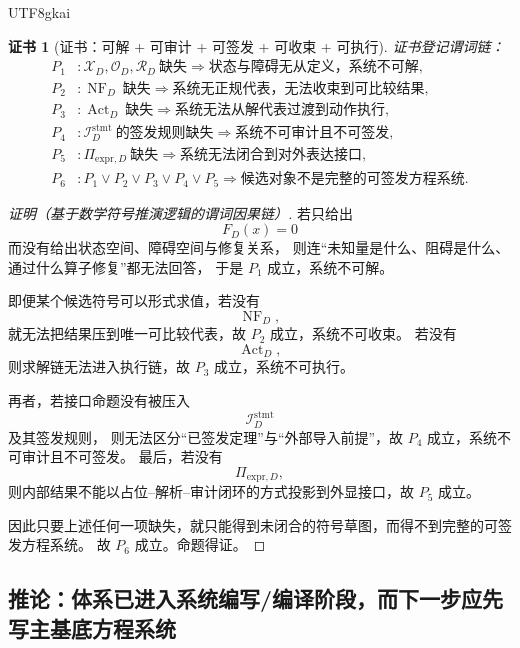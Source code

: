 \documentclass[12pt]{article}
\newtheorem{Certificate}{证书}[section]
\begin{document}
\begin{CJK*}{UTF8}{gkai}
\begin{Certificate}[证书：可解 + 可审计 + 可签发 + 可收束 + 可执行]
\label{cert:tex37-ch11-complete-equations}
证书登记谓词链：
\[
\begin{aligned}
  P_1 &: \mathcal X_D,\mathcal O_D,\mathcal R_D\ \text{缺失}
  \Rightarrow
  \text{状态与障碍无从定义，系统不可解},\\
  P_2 &: \operatorname{NF}_D\ \text{缺失}
  \Rightarrow
  \text{系统无正规代表，无法收束到可比较结果},\\
  P_3 &: \operatorname{Act}_D\ \text{缺失}
  \Rightarrow
  \text{系统无法从解代表过渡到动作执行},\\
  P_4 &: \mathcal I_D^{\mathrm{stmt}}\ \text{的签发规则缺失}
  \Rightarrow
  \text{系统不可审计且不可签发},\\
  P_5 &: \Pi_{\mathrm{expr},D}\ \text{缺失}
  \Rightarrow
  \text{系统无法闭合到对外表达接口},\\
  P_6 &: P_1\vee P_2\vee P_3\vee P_4\vee P_5
  \Rightarrow
  \text{候选对象不是完整的可签发方程系统}.
\end{aligned}
\]
\end{Certificate}

\begin{proof}[证明（基于数学符号推演逻辑的谓词因果链）]
若只给出
\[
  F_D(x)=0
\]
而没有给出状态空间、障碍空间与修复关系，
则连“未知量是什么、阻碍是什么、通过什么算子修复”都无法回答，
于是 $P_1$ 成立，系统不可解。

即便某个候选符号可以形式求值，若没有
\[
  \operatorname{NF}_D,
\]
就无法把结果压到唯一可比较代表，故 $P_2$ 成立，系统不可收束。
若没有
\[
  \operatorname{Act}_D,
\]
则求解链无法进入执行链，故 $P_3$ 成立，系统不可执行。

再者，若接口命题没有被压入
\[
  \mathcal I_D^{\mathrm{stmt}}
\]
及其签发规则，
则无法区分“已签发定理”与“外部导入前提”，故 $P_4$ 成立，系统不可审计且不可签发。
最后，若没有
\[
  \Pi_{\mathrm{expr},D},
\]
则内部结果不能以占位--解析--审计闭环的方式投影到外显接口，故 $P_5$ 成立。

因此只要上述任何一项缺失，就只能得到未闭合的符号草图，而得不到完整的可签发方程系统。
故 $P_6$ 成立。命题得证。
\end{proof}

\subsection{推论：体系已进入系统编写/编译阶段，而下一步应先写主基底方程系统}
\label{subsec:tex37-ch11-corollary}


\end{CJK*}
\end{document}
